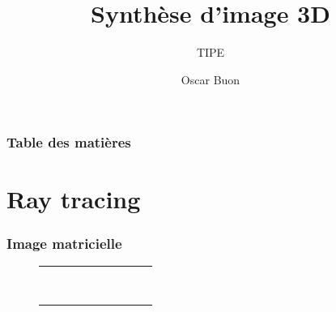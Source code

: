 \documentclass[handout]{beamer}
\title{Synthèse d’image 3D}
\subtitle{TIPE}
\author{Oscar Buon}
\begin{document}
\begin{frame}
    \maketitle
\end{frame}

\begin{frame}
    \frametitle{Table des matières}
    \tableofcontents
\end{frame}

\section{Ray tracing}

\begin{frame}
    \frametitle{Image matricielle}

    \begin{figure}
    \begin{tabular}{ | c | c | c | c | c | c | c | c | c | c | }
        \hline
        & & & & & & & & & \\
        \hline
        & & & & & & & & & \\
        \hline
        & & & & & & & & & \\
        \hline
        & & & & & & & & & \\
        \hline
        & & & & & & & & & \\
        \hline
        & & & & & & & & & \\
        \hline
        & & & & & & & & & \\
        \hline
        & & & & & & & & & \\
        \hline
        & & & & & & & & & \\
        \hline
        & & & & & & & & & \\
        \hline
    \end{tabular}
    \end{figure}

\end{frame}
\end{document}
